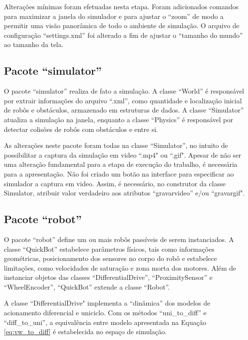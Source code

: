	Alterações mínimas foram efetuadas nesta etapa. Foram adicionados comandos para
	maximizar a janela do simulador e para ajustar o ``zoom'' de modo a permitir uma
	visão panorâmica de todo o ambiente de simulação. O arquivo de configuração
	``settings.xml'' foi alterado a fim de ajustar o ``tamanho do mundo'' ao
	tamanho da	tela.
	
	\subsection{Pacote ``simulator''}
	
	O pacote ``simulator'' realiza de fato a simulação. A classe ``World'' é
	responsável por extrair informações do arquivo ``.xml'', como quantidade e
	localização inicial de robôs e obstáculos, armazenado em estruturas de dados.
	A classe ``Simulator'' atualiza a simulação na janela, enquanto a
	classe ``Physics'' é responsável por detectar colisões de robôs com obstáculos
	e entre si. 
	
	As alterações neste pacote foram todas na classe ``Simulator'', no intuito
	de possibilitar a captura da simulação em video ``.mp4" ou ``.gif". Apesar de
	não ser uma alteração fundamental para a etapa de execução do trabalho, é
	necessária para a apresentação. Não foi criado um botão na interface para
	especificar ao simulador a captura em video. Assim, é necessário, no
	construtor da classe Simulator, atribuir valor verdadeiro aos atributos
	``gravarvideo'' e/ou ``gravargif". 
	
	\subsection{Pacote ``robot''}
	
	O pacote ``robot'' define um ou mais robôs passíveis de serem instanciados. A
	classe ``QuickBot'' estabelece parâmetros físicos, tais como informações
	geométricas, posicionamento dos sensores no corpo do robô e estabelece
	limitações, como velocidades de saturação e zona morta dos motores. Além de
	instanciar objetos das classes ``DifferentialDrive'', ``ProximitySensor'' e
	``WheelEncoder'', ``QuickBot'' extende a classe ``Robot''. 
	
	A classe ``DifferentialDrive" implementa a ``dinâmica'' dos modelos de
	acionamento diferencial e uniciclo. Com os métodos ``uni\_to\_diff'' e ``diff\_to\_uni'', a
	equivalência entre modelo apresentada na Equação \ref{eq:vw_to_diff} é
	estabelecida no espaço de simulação. 

